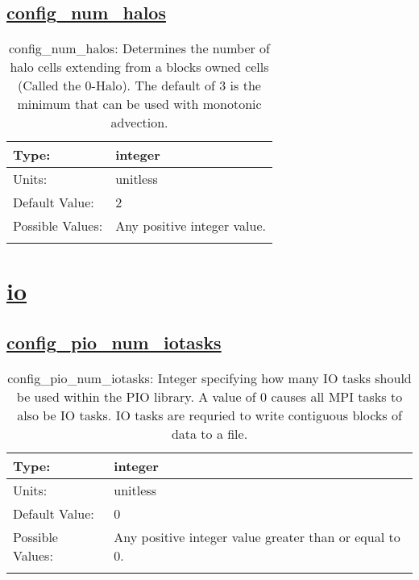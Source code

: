 \subsection[config\_num\_halos]{\hyperref[sec:nm_tab_seaice_model]{config\_num\_halos}}
\label{subsec:nm_sec_config_num_halos}
\begin{center}
\begin{longtable}{| p{2.0in} || p{4.0in} |}
    \hline
    Type: & integer \\
    \hline
    Units: & \si{unitless} \\
    \hline
    Default Value: & 2 \\
    \hline
    Possible Values: & Any positive integer value. \\
    \hline
    \caption{config\_num\_halos: Determines the number of halo cells extending from a blocks owned cells (Called the 0-Halo). The default of 3 is the minimum that can be used with monotonic advection.}
\end{longtable}
\end{center}
\section[io]{\hyperref[sec:nm_tab_io]{io}}
\label{sec:nm_sec_io}
\subsection[config\_pio\_num\_iotasks]{\hyperref[sec:nm_tab_io]{config\_pio\_num\_iotasks}}
\label{subsec:nm_sec_config_pio_num_iotasks}
\begin{center}
\begin{longtable}{| p{2.0in} || p{4.0in} |}
    \hline
    Type: & integer \\
    \hline
    Units: & \si{unitless} \\
    \hline
    Default Value: & 0 \\
    \hline
    Possible Values: & Any positive integer value greater than or equal to 0. \\
    \hline
    \caption{config\_pio\_num\_iotasks: Integer specifying how many IO tasks should be used within the PIO library. A value of 0 causes all MPI tasks to also be IO tasks. IO tasks are requried to write contiguous blocks of data to a file.}
\end{longtable}
\end{center}
